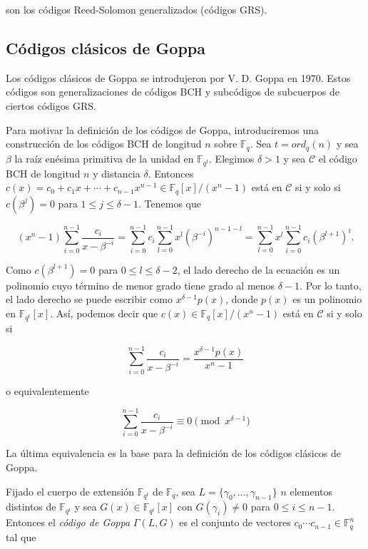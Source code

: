 son los códigos Reed-Solomon generalizados (códigos GRS).

\subsection{Códigos clásicos de Goppa}

Los códigos clásicos de Goppa se introdujeron por V. D. Goppa en 1970. Estos códigos son generalizaciones de códigos BCH y subcódigos de subcuerpos de ciertos códigos GRS.

Para motivar la definición de los códigos de Goppa, introduciremos una construcción de los códigos BCH de longitud $n$ sobre $\mathbb{F}_q$. Sea $t = ord_q(n)$ y sea $\beta$ la raíz enésima primitiva de la unidad en $\mathbb{F}_{q^t}$. Elegimos $\delta > 1$ y sea $\mathcal{C}$ el código BCH de longitud $n$ y distancia $\delta$. Entonces $c(x) = c_0 + c_1x + \cdots + c_{n-1}x^{n-1} \in \mathbb{F}_q [x] / (x^n - 1)$ está en $\mathcal{C}$ si y solo si $c(\beta^j) = 0$ para $1 \leq j \leq \delta - 1$. Tenemos que 

$$(x^n - 1) \sum_{i=0}^{n-1} \frac{c_i}{x - \beta ^{-i}} = \sum_{i=0}^{n-1} c_i \sum_{l=0}^{n-1} x^l \left( \beta ^{-i} \right) ^{n-1-l} = \sum_{l=0}^{n-1} x^l \sum_{i=0}^{n-1} c_i \left( \beta^{l+1} \right) ^i.$$

Como $c(\beta^{l+1}) = 0$ para $0 \leq l \leq \delta - 2$, el lado derecho de la ecuación es un polinomio cuyo término de menor grado tiene grado al menos $\delta - 1$. Por lo tanto, el lado derecho se puede escribir como $x^{\delta - 1} p(x)$, donde $p(x)$ es un polinomio en $\mathbb{F}_{q^t}[x]$. Así, podemos decir que $c(x) \in \mathbb{F}_q[x] / (x^n - 1)$ está en $\mathcal{C}$ si y solo si 

$$\sum_{i=0}^{n-1} \frac{c_i}{x - \beta ^{-i}} = \frac{x^{\delta - 1} p(x)}{x^n - 1}$$

o equivalentemente

$$\sum_{i=0}^{n-1} \frac{c_i}{x - \beta ^{-i}} \equiv 0 \pmod{x^{\delta - 1}}$$

La última equivalencia es la base para la definición de los códigos clásicos de Goppa.

Fijado el cuerpo de extensión $\mathbb{F}_{q^t}$ de $\mathbb{F}_q$, sea $L = \{ \gamma_0, ..., \gamma_{n-1} \}$ $n$ elementos distintos de $\mathbb{F}_{q^t}$ y sea $G(x) \in \mathbb{F}_{q^t}[x]$ con $G(\gamma_i) \neq 0$ para $0 \leq i \leq n - 1$. Entonces el \emph{código de Goppa} $\Gamma (L,G)$ es el conjunto de vectores $c_0 \cdots c_{n-1} \in \mathbb{F}_q^n$ tal que 


